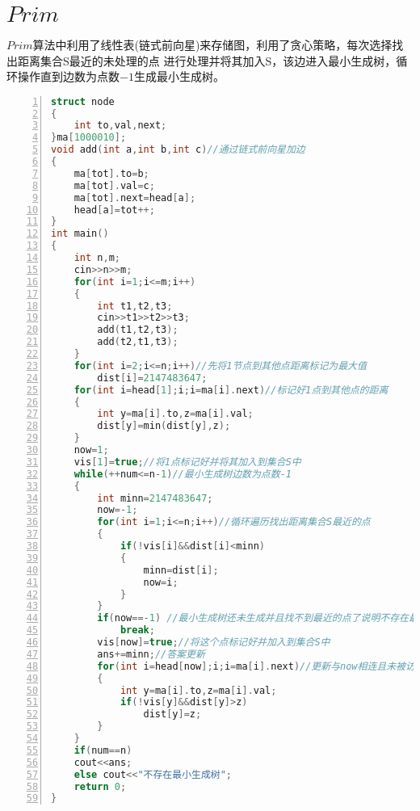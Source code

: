 \documentclass{article}
\begin{document}
\newpage
\section{$Prim$}
$Prim$算法中利用了线性表(链式前向星)来存储图，利用了贪心策略，每次选择找出距离集合S最近的未处理的点
进行处理并将其加入S，该边进入最小生成树，循环操作直到边数为点数$-1$生成最小生成树。

\begin{lstlisting}[language=C++,numbers=left,breaklines=true]
struct node 
{
    int to,val,next;
}ma[1000010];
void add(int a,int b,int c)//通过链式前向星加边
{
    ma[tot].to=b;
    ma[tot].val=c;
    ma[tot].next=head[a];
    head[a]=tot++;
}
int main()
{
    int n,m;
	cin>>n>>m;
	for(int i=1;i<=m;i++)
	{
		int t1,t2,t3;
		cin>>t1>>t2>>t3;
		add(t1,t2,t3);
		add(t2,t1,t3);
	}
    for(int i=2;i<=n;i++)//先将1节点到其他点距离标记为最大值
        dist[i]=2147483647;
    for(int i=head[1];i;i=ma[i].next)//标记好1点到其他点的距离
    {
        int y=ma[i].to,z=ma[i].val;
        dist[y]=min(dist[y],z);
    }
    now=1;
    vis[1]=true;//将1点标记好并将其加入到集合S中
    while(++num<=n-1)//最小生成树边数为点数-1
    {   
        int minn=2147483647;
        now=-1;
        for(int i=1;i<=n;i++)//循环遍历找出距离集合S最近的点
        {
            if(!vis[i]&&dist[i]<minn)
            {
                minn=dist[i];
                now=i;
            }
        }
        if(now==-1) //最小生成树还未生成并且找不到最近的点了说明不存在最小生成树
            break;
        vis[now]=true;//将这个点标记好并加入到集合S中
        ans+=minn;//答案更新
        for(int i=head[now];i;i=ma[i].next)//更新与now相连且未被访问的点离集合S的距离，更新距离
        {
            int y=ma[i].to,z=ma[i].val;
            if(!vis[y]&&dist[y]>z)
                dist[y]=z;
        }
    }
    if(num==n) 
    cout<<ans;
    else cout<<"不存在最小生成树";
    return 0;
}
\end{lstlisting}
\newpage
\end{document}
